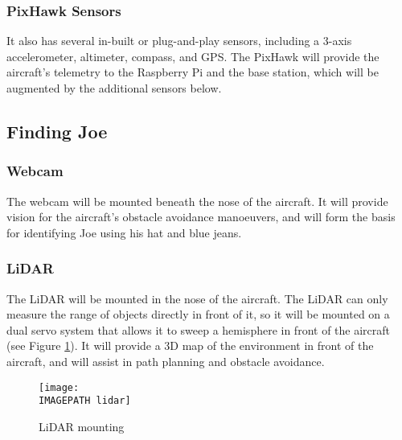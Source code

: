 \subsubsection*{PixHawk Sensors}
It also has several in-built or plug-and-play sensors, including a 3-axis accelerometer, altimeter, compass, and GPS. The PixHawk will provide the aircraft's telemetry to the Raspberry Pi and the base station, which will be augmented by the additional sensors below.

\subsection{Finding Joe}
\subsubsection*{Webcam}
The webcam will be mounted beneath the nose of the aircraft. It will provide vision for the aircraft's obstacle avoidance manoeuvers, and will form the basis for identifying Joe using his hat and blue jeans.

\subsubsection*{LiDAR}
The LiDAR will be mounted in the nose of the aircraft. The LiDAR can only measure the range of objects directly in front of it, so it will be mounted on a dual servo system that allows it to sweep a hemisphere in front of the aircraft (see Figure \ref*{fig:lidar}). It will provide a 3D map of the environment in front of the aircraft, and will assist in path planning and obstacle avoidance.






\begin{figure}[!h]
	\centering
	\texttt{[image: \\IMAGEPATH lidar]}
	\caption{LiDAR mounting}
	\label{fig:lidar}
\end{figure}